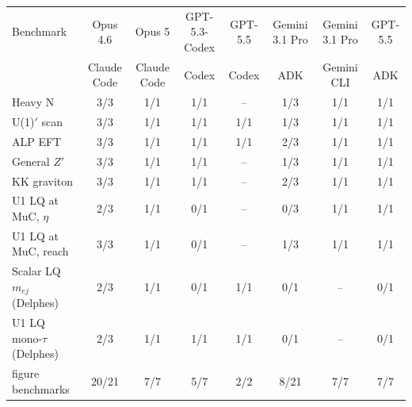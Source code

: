 \begin{tabular}{lccccccc}
\toprule
Benchmark & Opus 4.6 & Opus 5 & GPT-5.3-Codex & GPT-5.5 & Gemini 3.1 Pro & Gemini 3.1 Pro & GPT-5.5 \\
 & Claude Code & Claude Code & Codex & Codex & ADK & Gemini CLI & ADK \\
\midrule
Heavy N & 3/3 & 1/1 & 1/1 & -- & 1/3 & 1/1 & 1/1 \\
U(1)$'$ scan & 3/3 & 1/1 & 1/1 & 1/1 & 1/3 & 1/1 & 1/1 \\
ALP EFT & 3/3 & 1/1 & 1/1 & 1/1 & 2/3 & 1/1 & 1/1 \\
General $Z'$ & 3/3 & 1/1 & 1/1 & -- & 1/3 & 1/1 & 1/1 \\
KK graviton & 3/3 & 1/1 & 1/1 & -- & 2/3 & 1/1 & 1/1 \\
U1 LQ at MuC, $\eta$ & 2/3 & 1/1 & 0/1 & -- & 0/3 & 1/1 & 1/1 \\
U1 LQ at MuC, reach & 3/3 & 1/1 & 0/1 & -- & 1/3 & 1/1 & 1/1 \\
\midrule
Scalar LQ $m_{ej}$ (Delphes) & 2/3 & 1/1 & 0/1 & 1/1 & 0/1 & -- & 0/1 \\
U1 LQ mono-$\tau$ (Delphes) & 2/3 & 1/1 & 1/1 & 1/1 & 0/1 & -- & 0/1 \\
\midrule
figure benchmarks & 20/21 & 7/7 & 5/7 & 2/2 & 8/21 & 7/7 & 7/7 \\
\bottomrule
\end{tabular}

